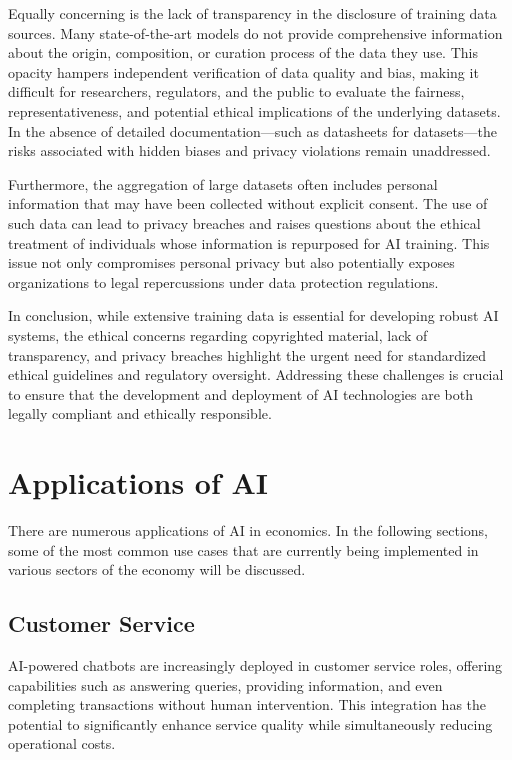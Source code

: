 Equally concerning is the lack of transparency in the disclosure of training data sources. Many state-of-the-art models do not provide comprehensive information about the origin, composition, or curation process of the data they use. This opacity hampers independent verification of data quality and bias, making it difficult for researchers, regulators, and the public to evaluate the fairness, representativeness, and potential ethical implications of the underlying datasets. In the absence of detailed documentation—such as datasheets for datasets—the risks associated with hidden biases and privacy violations remain unaddressed.

Furthermore, the aggregation of large datasets often includes personal information that may have been collected without explicit consent. The use of such data can lead to privacy breaches and raises questions about the ethical treatment of individuals whose information is repurposed for AI training. This issue not only compromises personal privacy but also potentially exposes organizations to legal repercussions under data protection regulations.

In conclusion, while extensive training data is essential for developing robust AI systems, the ethical concerns regarding copyrighted material, lack of transparency, and privacy breaches highlight the urgent need for standardized ethical guidelines and regulatory oversight. Addressing these challenges is crucial to ensure that the development and deployment of AI technologies are both legally compliant and ethically responsible.



\section{Applications of AI }
\label{sec:applications-of-ai}

There are numerous applications of AI in economics. In the following sections, some of the most common use cases that are 
currently being implemented in various sectors of the economy will be discussed.

\subsection{Customer Service}
\label{subsec:customer-service}

AI-powered chatbots are increasingly deployed in customer service roles, offering capabilities such as answering queries, providing information, and even completing transactions without human intervention. This integration has the potential to significantly enhance service quality while simultaneously reducing operational costs.  

